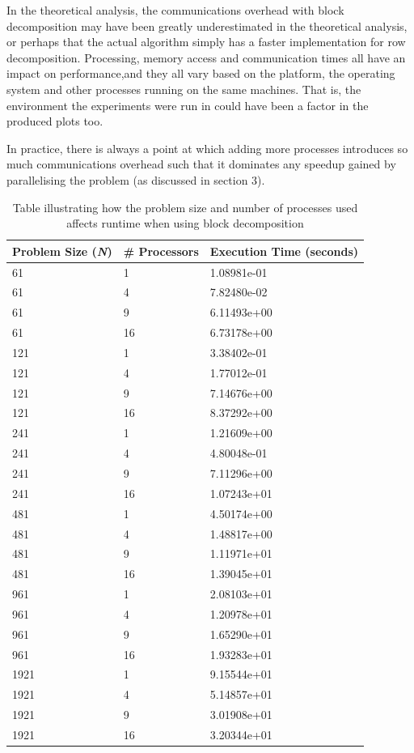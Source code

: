 \documentclass{article}
\begin{document}
In the theoretical analysis, the communications overhead with block decomposition may have been greatly underestimated in the theoretical analysis, or perhaps that the actual algorithm simply has a faster implementation for row decomposition. Processing, memory access and communication times all have an impact on performance,and they all vary based on the platform, the operating system and other processes running on the same machines. That is, the environment the experiments were run in could have been a factor in the produced plots too.

In practice, there is always a point at which adding more processes introduces so much communications overhead such that it dominates any speedup gained by parallelising the problem (as discussed in section 3). 

\begin{table}
	\centering
	\begin{tabular}{|l|l|l|}
	\hline
	\textbf{Problem Size (\textit{N})} & \textbf{\# Processors} & \textbf{Execution Time (seconds)} \\ 
	\hline
	61 & 1 & 1.08981e-01 \\
	61 & 4 & 7.82480e-02 \\
	61 & 9 & 6.11493e+00 \\
	61 & 16 & 6.73178e+00 \\
	\hline	
	121 & 1 & 3.38402e-01 \\
	121 & 4 & 1.77012e-01 \\
	121 & 9 & 7.14676e+00 \\
	121 & 16 & 8.37292e+00 \\
	\hline	
	241 & 1 & 1.21609e+00 \\
	241 & 4 & 4.80048e-01 \\
	241 & 9 & 7.11296e+00 \\
	241 & 16 & 1.07243e+01 \\
	\hline	
	481 & 1 & 4.50174e+00 \\
	481 & 4 & 1.48817e+00 \\
	481 & 9 & 1.11971e+01 \\
	481 & 16 & 1.39045e+01 \\
	\hline	
	961 & 1 & 2.08103e+01 \\
	961 & 4 & 1.20978e+01 \\
	961 & 9 & 1.65290e+01 \\
	961 & 16 & 1.93283e+01 \\
	\hline	
	1921 & 1 & 9.15544e+01 \\
	1921 & 4 & 5.14857e+01 \\
	1921 & 9 & 3.01908e+01 \\
	1921 & 16 & 3.20344e+01 \\
	\hline
	\end{tabular}
	\caption{Table illustrating how the problem size and number of processes used affects runtime when using block decomposition}
	\label{tab:block_decomp_scalability}
\end{table}
\end{document}
